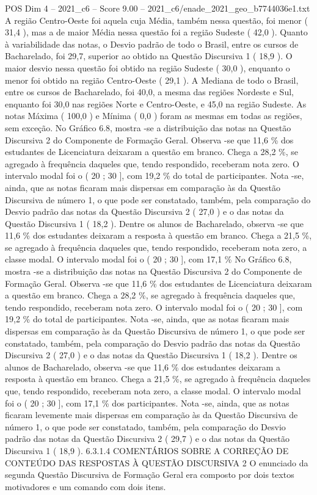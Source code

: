 \begin{textsample}{POS Dim 4 – 2021\_c6 – Score 9.00 – 2021\_c6/enade\_2021\_geo\_b7744036e1.txt}
A região Centro-Oeste foi aquela cuja Média, também nessa questão, foi menor ( 31,4 ), mas a de maior Média nessa questão foi a região Sudeste ( 42,0 ).
Quanto à variabilidade das notas, o Desvio padrão de todo o Brasil, entre os cursos de Bacharelado, foi 29,7, superior ao obtido na Questão Discursiva 1 ( 18,9 ).
O maior desvio nessa questão foi obtido na região Sudeste ( 30,0 ), enquanto o menor foi obtido na região Centro-Oeste ( 29,1 ).
A Mediana de todo o Brasil, entre os cursos de Bacharelado, foi 40,0, a mesma das regiões Nordeste e Sul, enquanto foi 30,0 nas regiões Norte e Centro-Oeste, e 45,0 na região Sudeste.
As notas Máxima ( 100,0 ) e Mínima ( 0,0 ) foram as mesmas em todas as regiões, sem exceção.
No Gráfico 6.8, mostra -se a distribuição das notas na Questão Discursiva 2 do Componente de Formação Geral.
Observa -se que 11,6 \% dos estudantes de Licenciatura deixaram a questão em branco.
Chega a 28,2 \%, se agregado à frequência daqueles que, tendo respondido, receberam nota zero.
O intervalo modal foi o ( 20 ; 30 ], com 19,2 \% do total de participantes.
Nota -se, ainda, que as notas ficaram mais dispersas em comparação às da Questão Discursiva de número 1, o que pode ser constatado, também, pela comparação do Desvio padrão das notas da Questão Discursiva 2 ( 27,0 ) e o das notas da Questão Discursiva 1 ( 18,2 ).
Dentre os alunos de Bacharelado, observa -se que 11,6 \% dos estudantes deixaram a resposta à questão em branco.
Chega a 21,5 \%, se agregado à frequência daqueles que, tendo respondido, receberam nota zero, a classe modal.
O intervalo modal foi o ( 20 ; 30 ], com 17,1 \% No Gráfico 6.8, mostra -se a distribuição das notas na Questão Discursiva 2 do Componente de Formação Geral.
Observa -se que 11,6 \% dos estudantes de Licenciatura deixaram a questão em branco.
Chega a 28,2 \%, se agregado à frequência daqueles que, tendo respondido, receberam nota zero.
O intervalo modal foi o ( 20 ; 30 ], com 19,2 \% do total de participantes.
Nota -se, ainda, que as notas ficaram mais dispersas em comparação às da Questão Discursiva de número 1, o que pode ser constatado, também, pela comparação do Desvio padrão das notas da Questão Discursiva 2 ( 27,0 ) e o das notas da Questão Discursiva 1 ( 18,2 ).
Dentre os alunos de Bacharelado, observa -se que 11,6 \% dos estudantes deixaram a resposta à questão em branco.
Chega a 21,5 \%, se agregado à frequência daqueles que, tendo respondido, receberam nota zero, a classe modal.
O intervalo modal foi o ( 20 ; 30 ], com 17,1 \% dos participantes.
Nota -se, ainda, que as notas ficaram levemente mais dispersas em comparação às da Questão Discursiva de número 1, o que pode ser constatado, também, pela comparação do Desvio padrão das notas da Questão Discursiva 2 ( 29,7 ) e o das notas da Questão Discursiva 1 ( 18,9 ). 6.3.1.4 COMENTÁRIOS SOBRE A CORREÇÃO DE CONTEÚDO DAS RESPOSTAS À QUESTÃO DISCURSIVA 2 O enunciado da segunda Questão Discursiva de Formação Geral era composto por dois textos motivadores e um comando com dois itens.

\end{textsample}
